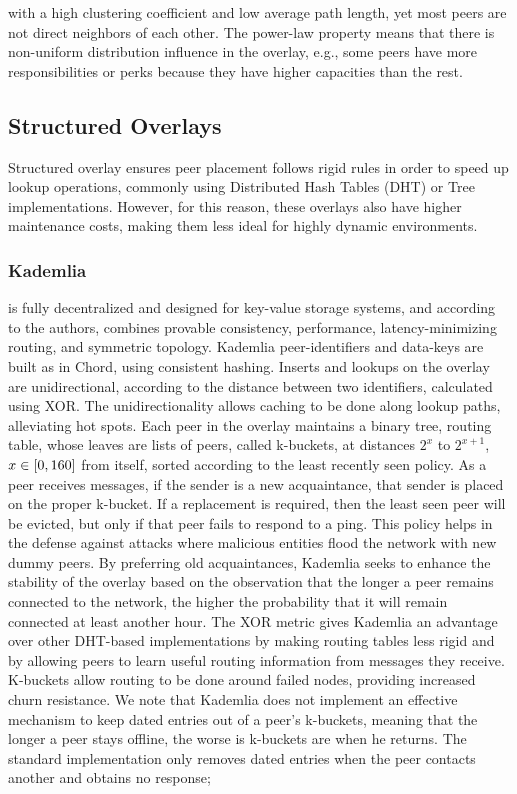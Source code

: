 \documentclass[runningheads]{llncs}
\begin{document}
with a high clustering coefficient and low average path length, yet most peers are not direct neighbors of each other. The power-law property means that there is non-uniform distribution influence in the overlay, e.g., some peers have more responsibilities or perks because they have higher capacities than the rest.

\subsection{Structured Overlays}
Structured overlay ensures peer placement follows rigid rules in order to speed up lookup operations, commonly using Distributed Hash Tables (DHT) or Tree implementations. However, for this reason, these overlays also have higher maintenance costs, making them less ideal for highly dynamic environments.

\subsubsection{Kademlia} \cite{kademlia} is fully decentralized and designed for key-value storage systems, and according to the authors, combines provable consistency, performance, latency-minimizing routing, and symmetric topology. Kademlia peer-identifiers and data-keys are built as in Chord\cite{chord}, using consistent hashing. Inserts and lookups on the overlay are unidirectional, according to the distance between two identifiers, calculated using XOR. The unidirectionality allows caching to be done along lookup paths, alleviating hot spots. Each peer in the overlay maintains a binary tree, routing table, whose leaves are lists of peers, called k-buckets, at distances $2^{x}$ to $2^{x+1}$, $x \in\hspace{1mm}\mathclose[0,160\mathclose]$ from itself, sorted according to the least recently seen policy. As a peer receives messages, if the sender is a new acquaintance, that sender is placed on the proper k-bucket. If a replacement is required, then the least seen peer will be evicted, but only if that peer fails to respond to a ping. This policy helps in the defense against attacks where malicious entities flood the network with new dummy peers. By preferring old acquaintances, Kademlia seeks to enhance the stability of the overlay based on the observation that the longer a peer remains connected to the network, the higher the probability that it will remain connected at least another hour\cite{ssaroiu:msp2pfss}. The XOR metric gives Kademlia an advantage over other DHT-based implementations by making routing tables less rigid and by allowing peers to learn useful routing information from messages they receive. K-buckets allow routing to be done around failed nodes, providing increased churn resistance. We note that Kademlia does not implement an effective mechanism to keep dated entries out of a peer's k-buckets, meaning that the longer a peer stays offline, the worse is k-buckets are when he returns. The standard implementation only removes dated entries when the peer contacts another and obtains no response;
\end{document}
